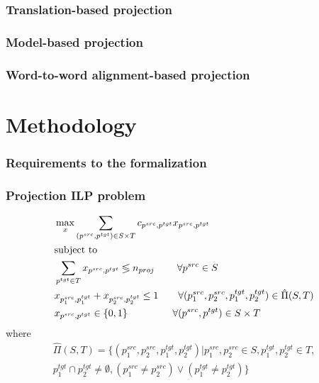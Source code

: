 \documentclass{beamer}
\newcommand{\src}[1]{#1^{src}}
\newcommand{\tgt}[1]{#1^{tgt}}
\begin{document}
\begin{frame}
  \frametitle{Translation-based projection}
\end{frame}

\begin{frame}
  \frametitle{Model-based projection}
\end{frame}

\begin{frame}
  \frametitle{Word-to-word alignment-based projection}
\end{frame}

\section{Methodology}

\begin{frame}
  \frametitle{Requirements to the formalization}
\end{frame}

\begin{frame}
  \frametitle{Projection ILP problem}

  \begin{align*}
    & \max\limits_x \sum\limits_{(\src{p}, \tgt{p}) \in S \times T} c_{\src{p}, \tgt{p}} x_{\src{p}, \tgt{p}} \\
    & \text{subject to}                                                                                                                      \\
    & \sum\limits_{\tgt{p} \in T} x_{\src{p}, \tgt{p}} \lessgtr n_{proj}
    \; \qquad \forall \src{p} \in S \\
    & x_{\src{p_1}, \tgt{p_1}} + x_{\src{p_2}, \tgt{p_2}} \leq 1
    \qquad \forall (\src{p_1}, \src{p_2}, \tgt{p_1}, \tgt{p_2}) \in \hat{\Pi}(S, T) \\
    & x_{\src{p}, \tgt{p}} \in \{ 0, 1 \}
    \; \;\qquad \qquad \forall (\src{p}, \tgt{p}) \in S \times T \notag
  \end{align*}
  where
  \begin{align*}
    \hat{\Pi}(S, T) = \Big\{ (\src{p_1}, \src{p_2}, \tgt{p_1}, \tgt{p_2}) \Big| \src{p_1}, \src{p_2} \in S, \tgt{p_1}, \tgt{p_2} \in T, \\
      \tgt{p_1} \cap \tgt{p_2} \neq \emptyset,
    (\src{p_1} \neq \src{p_2}) \lor (\tgt{p_1} \neq \tgt{p_2}) \Big\}
  \end{align*}
\end{frame}
\end{document}
